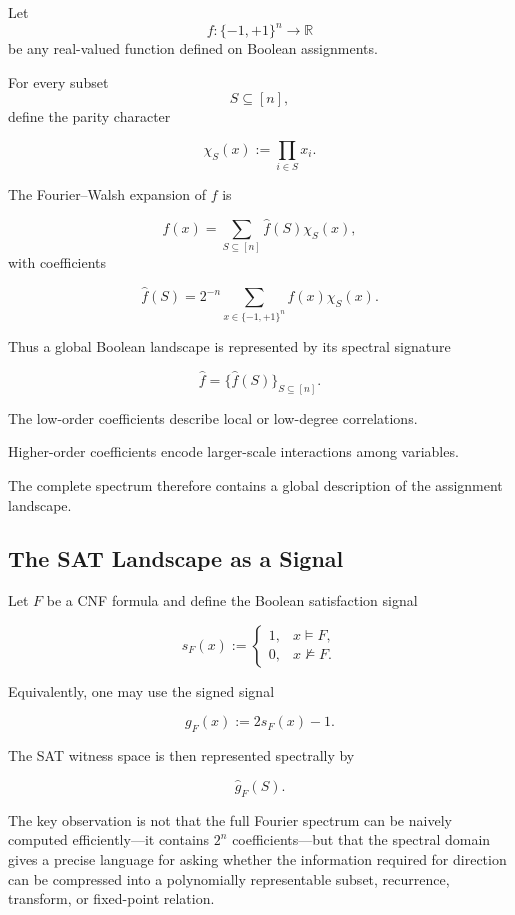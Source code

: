 \documentclass[11pt]{article}
\theoremstyle{plain}
\theoremstyle{definition}
\begin{document}
Let
\[
    f:\{-1,+1\}^{n}\to\mathbb{R}
\]
be any real-valued function defined on Boolean assignments.

For every subset
\[
    S\subseteq[n],
\]
define the parity character

\[
    \chi_S(x)
    :=
    \prod_{i\in S} x_i.
\]

The Fourier--Walsh expansion of \(f\) is~\cite{ODonnell2014}

\[
    f(x)
    =
    \sum_{S\subseteq[n]}
    \widehat f(S)\chi_S(x),
\]
with coefficients

\[
    \widehat f(S)
    =
    2^{-n}
    \sum_{x\in\{-1,+1\}^{n}}
    f(x)\chi_S(x).
\]

Thus a global Boolean landscape is represented by its spectral signature

\[
    \widehat f
    =
    \{\widehat f(S)\}_{S\subseteq[n]}.
\]

The low-order coefficients describe local or low-degree correlations.

Higher-order coefficients encode larger-scale interactions among variables.

The complete spectrum therefore contains a global description of the
assignment landscape.

\subsection{The SAT Landscape as a Signal}

Let \(F\) be a CNF formula and define the Boolean satisfaction signal

\[
    s_F(x)
    :=
    \begin{cases}
        1,&x\models F,\\
        0,&x\not\models F.
    \end{cases}
\]

Equivalently, one may use the signed signal

\[
    g_F(x)
    :=
    2s_F(x)-1.
\]

The SAT witness space is then represented spectrally by

\[
    \widehat g_F(S).
\]

The key observation is not that the full Fourier spectrum can be naively
computed efficiently---it contains \(2^n\) coefficients---but that the
spectral domain gives a precise language for asking whether the information
required for direction can be compressed into a polynomially representable
subset, recurrence, transform, or fixed-point relation.
\end{document}
